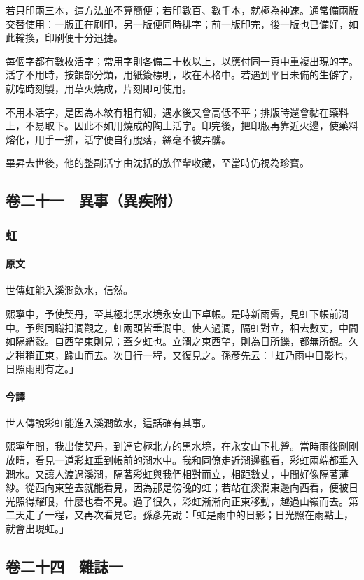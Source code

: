 \documentclass[UTF8,zihao=-4]{ctexart}
\begin{document}
若只印兩三本，這方法並不算簡便；若印數百、數千本，就極為神速。通常備兩版交替使用：一版正在刷印，另一版便同時排字；前一版印完，後一版也已備好，如此輪換，印刷便十分迅捷。

每個字都有數枚活字；常用字則各備二十枚以上，以應付同一頁中重複出現的字。活字不用時，按韻部分類，用紙簽標明，收在木格中。若遇到平日未備的生僻字，就臨時刻製，用草火燒成，片刻即可使用。

不用木活字，是因為木紋有粗有細，遇水後又會高低不平；排版時還會黏在藥料上，不易取下。因此不如用燒成的陶土活字。印完後，把印版再靠近火邊，使藥料熔化，用手一拂，活字便自行脫落，絲毫不被弄髒。

畢昇去世後，他的整副活字由沈括的族侄輩收藏，至當時仍視為珍寶。

\subsection*{卷二十一　異事（異疾附）}

\subsubsection*{虹}

\paragraph{原文}
世傳虹能入溪澗飲水，信然。

熙寧中，予使契丹，至其極北黑水境永安山下卓帳。是時新雨霽，見虹下帳前澗中。予與同職扣澗觀之，虹兩頭皆垂澗中。使人過澗，隔虹對立，相去數丈，中間如隔綃縠。自西望東則見；蓋夕虹也。立澗之東西望，則為日所鑠，都無所覩。久之稍稍正東，踰山而去。次日行一程，又復見之。孫彥先云：「虹乃雨中日影也，日照雨則有之。」

\paragraph{今譯}
世人傳說彩虹能進入溪澗飲水，這話確有其事。

熙寧年間，我出使契丹，到達它極北方的黑水境，在永安山下扎營。當時雨後剛剛放晴，看見一道彩虹垂到帳前的澗水中。我和同僚走近澗邊觀看，彩虹兩端都垂入澗水。又讓人渡過溪澗，隔著彩虹與我們相對而立，相距數丈，中間好像隔著薄紗。從西向東望去就能看見，因為那是傍晚的虹；若站在溪澗東邊向西看，便被日光照得耀眼，什麼也看不見。過了很久，彩虹漸漸向正東移動，越過山嶺而去。第二天走了一程，又再次看見它。孫彥先說：「虹是雨中的日影；日光照在雨點上，就會出現虹。」

\subsection*{卷二十四　雜誌一}
\end{document}
